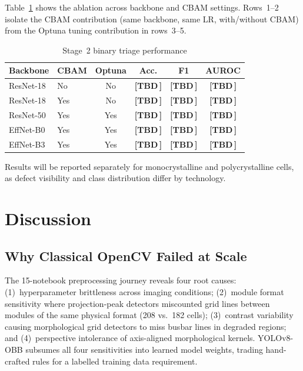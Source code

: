\documentclass[conference]{IEEEtran}
\newcommand{\tbd}[1][\,]{\textbf{[TBD#1]}}
\begin{document}
Table~\ref{tab:stage2_results} shows the ablation across
backbone and CBAM settings.
Rows~1--2 isolate the CBAM contribution (same backbone, same
LR, with/without CBAM) from the Optuna tuning contribution
in rows~3--5.

\begin{table}[t]
  \caption{Stage~2 binary triage performance}
  \label{tab:stage2_results}
  \begin{center}
  \renewcommand{\arraystretch}{1.1}
  \small
  \begin{tabular}{llcccc}
    \toprule
    \textbf{Backbone} & \textbf{CBAM} &
    \textbf{Optuna} & \textbf{Acc.} &
    \textbf{F1} & \textbf{AUROC} \\
    \midrule
    ResNet-18  & No  & No  & \tbd{} & \tbd{} & \tbd{} \\
    ResNet-18  & Yes & No  & \tbd{} & \tbd{} & \tbd{} \\
    ResNet-50  & Yes & Yes & \tbd{} & \tbd{} & \tbd{} \\
    EffNet-B0  & Yes & Yes & \tbd{} & \tbd{} & \tbd{} \\
    EffNet-B3  & Yes & Yes & \tbd{} & \tbd{} & \tbd{} \\
    \bottomrule
  \end{tabular}
  \end{center}
\end{table}

Results will be reported separately for monocrystalline and
polycrystalline cells, as defect visibility and class
distribution differ by technology.

\section{Discussion}

\subsection{Why Classical OpenCV Failed at Scale}

The 15-notebook preprocessing journey reveals four root causes:
(1)~hyperparameter brittleness across imaging conditions;
(2)~module format sensitivity where projection-peak detectors
miscounted grid lines between modules of the same physical
format (208 vs.\ 182 cells);
(3)~contrast variability causing morphological grid detectors
to miss busbar lines in degraded regions; and
(4)~perspective intolerance of axis-aligned morphological
kernels.
YOLOv8-OBB subsumes all four sensitivities into learned model
weights, trading hand-crafted rules for a labelled training
data requirement.
\end{document}
